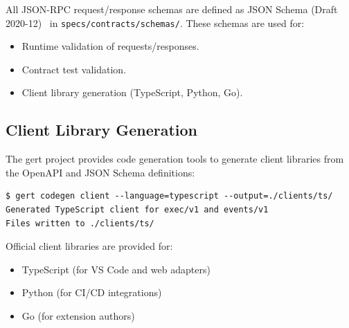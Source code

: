 All JSON-RPC request/response schemas are defined as JSON Schema (Draft
2020-12)~\cite{jsonschema-spec} in \texttt{specs/contracts/schemas/}.  These
schemas are used for:

\begin{itemize}
  \item Runtime validation of requests/responses.
  \item Contract test validation.
  \item Client library generation (TypeScript, Python, Go).
\end{itemize}

\subsection{Client Library Generation}

The gert project provides code generation tools to generate client libraries
from the OpenAPI and JSON Schema definitions:

\begin{verbatim}
$ gert codegen client --language=typescript --output=./clients/ts/
Generated TypeScript client for exec/v1 and events/v1
Files written to ./clients/ts/
\end{verbatim}

Official client libraries are provided for:

\begin{itemize}
  \item TypeScript (for VS Code and web adapters)
  \item Python (for CI/CD integrations)
  \item Go (for extension authors)
\end{itemize}

